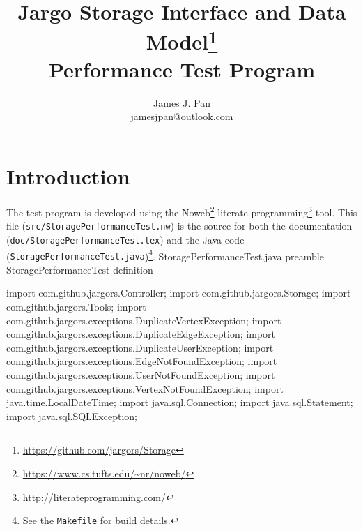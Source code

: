 \documentclass{article}
\title{Jargo Storage Interface
  and Data Model\footnote{\url{https://github.com/jargors/Storage}}\\
  \vspace{.5em}
  \Large{\textbf{Performance Test Program}}}
\author{James J. Pan\\
  \small{\href{mailto:jamesjpan@outlook.com}{jamesjpan@outlook.com}}
}
\def\nwendcode{\endtrivlist \endgroup}
\let\nwdocspar=\par
\begin{document}
\maketitle
\pagestyle{noweb}


\tableofcontents

\section{Introduction}
\label{sec:introduction}
The test program is developed using the
Noweb\footnote{\url{https://www.cs.tufts.edu/~nr/noweb/}} literate
programming\footnote{\url{http://literateprogramming.com/}} tool.  This file
({\tt{}src/StoragePerformanceTest.nw}) is the source for both the documentation
({\tt{}doc/StoragePerformanceTest.tex}) and the Java code
({\tt{}StoragePerformanceTest.java})\footnote{See the {\tt{}Makefile} for build
details.}.
\endmoddef{}
\LA{}StoragePerformanceTest.java preamble~{\nwtagstyle{}}\RA{}
\LA{}\code{}StoragePerformanceTest\edoc{} definition~{\nwtagstyle{}}\RA{}
\nwendcode{}\nwdocspar

\nwenddocs{}\endmoddef{}
import com.github.jargors.Controller;
import com.github.jargors.Storage;
import com.github.jargors.Tools;
import com.github.jargors.exceptions.DuplicateVertexException;
import com.github.jargors.exceptions.DuplicateEdgeException;
import com.github.jargors.exceptions.DuplicateUserException;
import com.github.jargors.exceptions.EdgeNotFoundException;
import com.github.jargors.exceptions.UserNotFoundException;
import com.github.jargors.exceptions.VertexNotFoundException;
import java.time.LocalDateTime;
import java.sql.Connection;
import java.sql.Statement;
import java.sql.SQLException;
\nwendcode{}\nwdocspar
\end{document}
